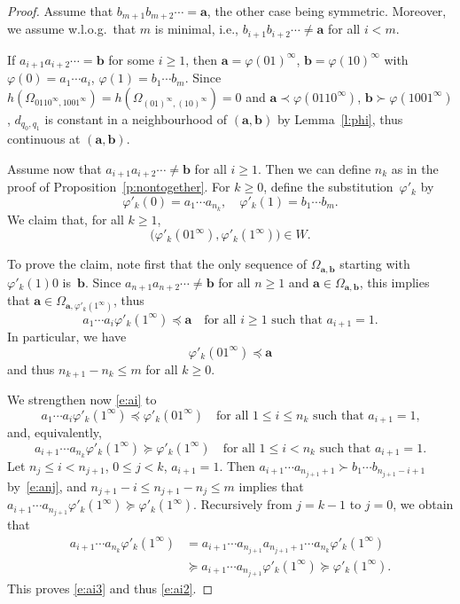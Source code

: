 \documentclass[10pt,a4paper]{amsart}
\newcommand{\ba}{\mathbf{a}}
\newcommand{\bb}{\mathbf{b}}
\begin{document}
\begin{proof}
Assume that $b_{m+1} b_{m+2} \cdots = \ba$, the other case being symmetric.
Moreover, we assume w.l.o.g.\ that $m$ is minimal, i.e., $b_{i+1} b_{i+2} \cdots \ne \ba$ for all $i < m$.

If $a_{i+1}a_{i+2}\cdots = \bb$ for some $i \ge 1$, then $\ba = \varphi(01)^\infty$, $\bb = \varphi(10)^\infty$ with $\varphi(0) = a_1\cdots a_i$, $\varphi(1) = b_1\cdots b_m$.
Since $h(\Omega_{0110^\infty,1001^\infty}) = h(\Omega_{(01)^\infty,(10)^\infty}) = 0$ and $\ba \prec \varphi(0110^\infty)$, $\bb \succ \varphi(1001^\infty)$, $d_{q_0,q_1}$ is constant in a neighbourhood of $(\ba,\bb)$ by Lemma~\ref{l:phi}, thus continuous at $(\ba,\bb)$. 

Assume now that $a_{i+1}a_{i+2}\cdots \ne \bb$ for all $i \ge 1$.
Then we can define $n_k$ as in the proof of Proposition~\ref{p:nontogether}.
For $k \ge 0$, define the substitution~$\varphi'_k$ by
\[
\varphi'_k(0) = a_1 \cdots a_{n_k}, \quad \varphi'_k(1) = b_1 \cdots b_m.
\]
We claim that, for all $k \ge 1$,
\begin{equation} \label{e:phi'}
\big(\varphi'_k(01^\infty), \varphi'_k(1^\infty)\big) \in W.
\end{equation}

To prove the claim, note first that the only sequence of $\Omega_{\ba,\bb}$ starting with $\varphi'_k(1)0$ is~$\bb$.
Since $a_{n+1}a_{n+2}\cdots \ne \bb$ for all $n \ge 1$ and $\ba \in \Omega_{\ba,\bb}$, this implies that $\ba \in \Omega_{\ba,\varphi'_k(1^\infty)}$, thus 
\begin{equation} \label{e:ai}
a_1 \cdots a_i \varphi'_k(1^\infty) \preceq \ba \quad \mbox{for all $i \ge 1$ such that $a_{i+1} = 1$.}
\end{equation}
In particular, we have
\[
\varphi'_k(01^\infty) \preceq \ba
\]
and thus $n_{k+1}{-}n_k \le m$ for all $k \ge 0$.

We strengthen now \eqref{e:ai} to 
\begin{equation} \label{e:ai2}
a_1 \cdots a_i \varphi'_k(1^\infty) \preceq \varphi'_k(01^\infty) \quad \mbox{for all $1 \le i \le n_k$ such that $a_{i+1} = 1$,}
\end{equation}
and, equivalently, 
\begin{equation} \label{e:ai3}
a_{i+1} \cdots a_{n_k} \varphi'_k(1^\infty) \succeq \varphi'_k(1^\infty) \quad \mbox{for all $1 \le i < n_k$ such that $a_{i+1} = 1$.}
\end{equation}
Let $n_j \le i < n_{j+1}$, $0 \le j < k$, $a_{i+1} = 1$.
Then $a_{i+1} \cdots a_{n_{j+1}+1} \succ b_1 \cdots b_{n_{j+1}-i+1}$ by~\eqref{e:anj}, and $n_{j+1}{-}i \le n_{j+1}{-}n_j \le m$ implies that $a_{i+1} \cdots a_{n_{j+1}} \varphi'_k(1^\infty) \succeq \varphi'_k(1^\infty)$.
Recursively from $j = k{-}1$ to $j = 0$, we obtain that
\[
\begin{aligned}
a_{i+1} \cdots a_{n_k} \varphi'_k(1^\infty) & = a_{i+1} \cdots a_{n_{j+1}} a_{n_{j+1}+1} \cdots a_{n_k} \varphi'_k(1^\infty) \\
& \succeq a_{i+1} \cdots a_{n_{j+1}} \varphi'_k(1^\infty) \succeq \varphi'_k(1^\infty).
\end{aligned}
\]
This proves \eqref{e:ai3} and thus \eqref{e:ai2}.


\end{proof}
\end{document}
